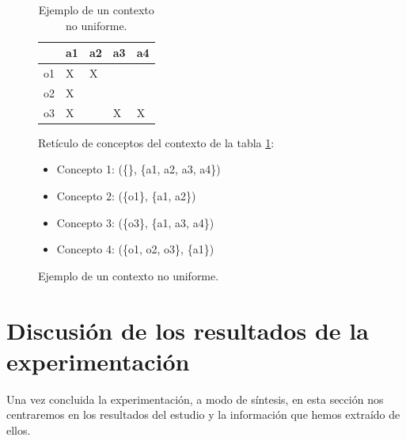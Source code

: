 \documentclass[oneside,openright,titlepage,numbers=noenddot,openany,headinclude,footinclude=true,
cleardoublepage=empty,abstractoff,BCOR=5mm,paper=a4,fontsize=12pt,main=spanish]{scrreprt}
\begin{document}
\begin{figure}[H]
\centering
\begin{minipage}{.4\textwidth}
  \centering
    \begin{table}[H]
    \begin{tabular}{|l|l|l|l|l|}
    \hline
       & a1 & a2 & a3 & a4 \\ \hline
    o1 & X  & X  & ~  & ~ \\ \hline
    o2 & X  & ~  & ~  & ~  \\ \hline
    o3 & X  & ~  & X  & X  \\ \hline
    \end{tabular}
    \caption{Ejemplo de un contexto no uniforme.}
    \label{tab:nouniforme}
    \end{table}
\end{minipage}%
\begin{minipage}{.6\textwidth}
  \centering
Retículo de conceptos del contexto de la tabla \ref{tab:nouniforme}:
\begin{itemize}
    \item Concepto 1: (\{\}, \{a1, a2, a3, a4\}) 
    \item Concepto 2: (\{o1\}, \{a1, a2\}) 
    \item Concepto 3: (\{o3\}, \{a1, a3, a4\}) 
    \item Concepto 4: (\{o1, o2, o3\}, \{a1\}) 
\end{itemize}
\end{minipage}
\end{figure}








\section{Discusión de los resultados de la experimentación}

Una vez concluida la experimentación, a modo de síntesis, en esta sección nos centraremos en los resultados del estudio y la información que hemos extraído de ellos. 
\end{document}
